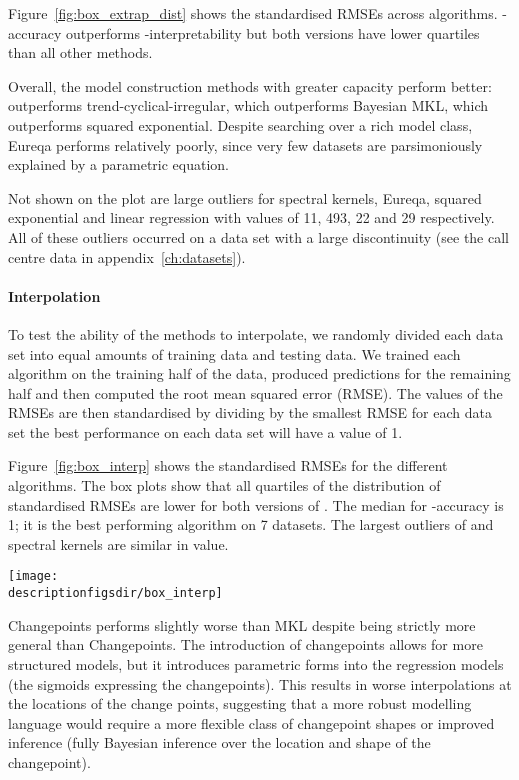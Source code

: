 Figure~\ref{fig:box_extrap_dist} shows the standardised RMSEs across algorithms.
\procedurename{}-accuracy outperforms \procedurename{}-interpretability but both versions have lower quartiles than all other methods.

Overall, the model construction methods with greater capacity perform better: \procedurename{} outperforms trend-cyclical-irregular, which outperforms Bayesian MKL, which outperforms squared exponential.
Despite searching over a rich model class, Eureqa performs relatively poorly, since very few datasets are parsimoniously explained by a parametric equation.

Not shown on the plot are large outliers for spectral kernels, Eureqa, squared exponential and linear regression with values of 11, 493, 22 and 29 respectively.
All of these outliers occurred on a data set with a large discontinuity (see the call centre data in appendix~\ref{ch:datasets}).

\paragraph{Interpolation}

To test the ability of the methods to interpolate, we randomly divided each data set into equal amounts of training data and testing data.
We trained each algorithm on the training half of the data, produced predictions for the remaining half and then computed the root mean squared error (RMSE).
The values of the RMSEs are then standardised by dividing by the smallest RMSE for each data set \ie the best performance on each data set will have a value of 1.

Figure~\ref{fig:box_interp} shows the standardised RMSEs for the different algorithms.
The box plots show that all quartiles of the distribution of standardised RMSEs are lower for both versions of \procedurename{}.
The median for \procedurename{}-accuracy is 1; it is the best performing algorithm on 7 datasets.
The largest outliers of \procedurename{} and spectral kernels are similar in value.

\begin{figure*}[ht]
\centering
\texttt{[image: \\descriptionfigsdir/box\_interp]}
\caption[RMSE comparison of \procedurename{} and other algorithms at interpolation.]{
Box plot of standardised RMSE (best performance = 1) on 13 interpolation tasks.
}
\label{fig:box_interp}
\end{figure*}

Changepoints performs slightly worse than MKL despite being strictly more general than Changepoints.
The introduction of changepoints allows for more structured models, but it introduces parametric forms into the regression models (\ie the sigmoids expressing the changepoints).
This results in worse interpolations at the locations of the change points, suggesting that a more robust modelling language would require a more flexible class of changepoint shapes or improved inference (\eg fully Bayesian inference over the location and shape of the changepoint).

